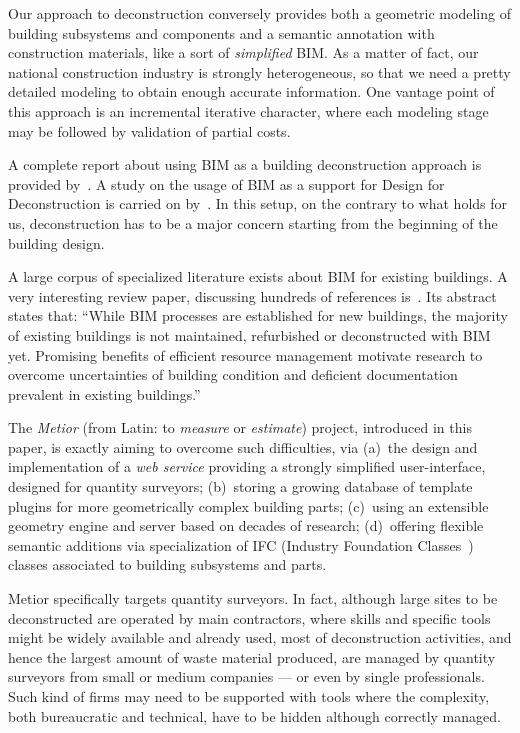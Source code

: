 \documentclass[a4paper,twoside]{article}
\begin{document}
Our approach to deconstruction conversely provides both a geometric modeling of building subsystems and components and a semantic annotation with construction materials, like a sort of \emph{simplified} BIM. As a matter of fact, our national construction industry is strongly heterogeneous, so that  we need a pretty detailed modeling to obtain enough accurate information.
One vantage point of this approach is an incremental iterative character, where each modeling stage may be followed by validation of partial costs.

A complete report about using BIM as a building deconstruction approach is provided by~\cite{galic2014bim}. A study on the usage of BIM as a support for Design for Deconstruction is carried on by~\cite{akinade2015waste}. In this setup, on the contrary to what holds for us, deconstruction has to be a major concern starting from the beginning of the building design.

A large corpus of specialized literature exists about BIM for existing buildings. A very interesting review paper, discussing hundreds of references is~\cite{Volk2014109}. Its abstract states that:  ``While BIM processes are established for new buildings, the majority of existing buildings is not maintained, refurbished or deconstructed with BIM yet. Promising benefits of efficient resource management motivate research to overcome uncertainties of building condition and deficient documentation prevalent in existing buildings.'' 

The \emph{Metior} (from Latin: to  \emph{measure} or  \emph{estimate}) project, introduced in this paper, is exactly aiming to overcome such difficulties, via (a)~the design and implementation of a \emph{web service} providing a strongly simplified user-interface, designed for quantity surveyors; (b)~storing a growing database of template plugins for more geometrically complex building parts; (c)~using an extensible geometry engine and server based on decades of research; (d)~offering flexible semantic additions via specialization of IFC (Industry Foundation Classes~\cite{ifc}) classes associated to building subsystems and parts.

Metior specifically targets quantity surveyors. In fact, although large sites to be deconstructed are operated by main contractors, where skills and specific tools might be widely available and already used, most of deconstruction activities, and hence the largest amount of waste material produced, are managed by quantity surveyors from small or medium companies --- or even by single professionals. Such kind of firms may need to be supported with tools where the complexity, both bureaucratic and technical, have to be hidden although correctly managed.
\end{document}

